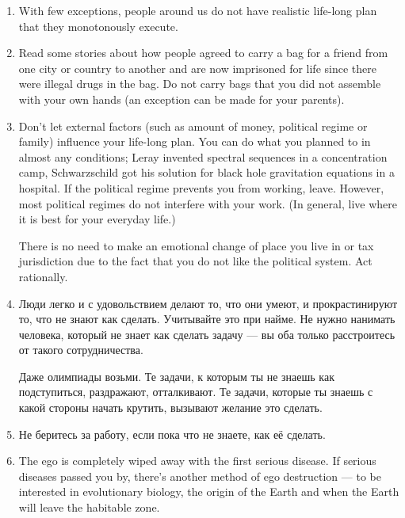 \documentclass[11pt]{article}
\theoremstyle{remark}
\theoremstyle{definition}
\begin{document}
\begin{enumerate}
\item With few exceptions, people around us do not have realistic life-long plan that they monotonously execute.

\item Read some stories about how people agreed to carry a bag for a friend from one city or country to another and are now imprisoned for life since there were illegal drugs in the bag. Do not carry bags that you did not assemble with your own hands (an exception can be made for your parents).


\item Don't let external factors (such as amount of money, political regime or family) influence your life-long plan. You can do what you planned to in almost any conditions; Leray invented spectral sequences in a concentration camp, Schwarzschild got his solution for black hole gravitation equations in a hospital. If the political regime prevents you from working, leave. However, most political regimes do not interfere with your work. (In general, live where it is best for your everyday life.)

There is no need to make an emotional change of place you live in or tax jurisdiction due to the fact that you do not like the political system. Act rationally.


\item Люди легко и с удовольствием делают то, что они умеют, и прокрастинируют то, что не знают как сделать. Учитывайте это при найме. Не нужно нанимать человека, который не знает как сделать задачу --- вы оба только расстроитесь от такого сотрудничества.


Даже олимпиады возьми. Те задачи, к которым ты не знаешь как подступиться, раздражают, отталкивают. Те задачи, которые ты знаешь с какой стороны начать крутить, вызывают желание это сделать.



\item Не беритесь за работу, если пока что не знаете, как её сделать.



\item The ego is completely wiped away with the first serious disease. If serious diseases passed you by, there's another method of ego destruction --- to be interested in evolutionary biology, the origin of the Earth and when the Earth will leave the habitable zone.


\end{enumerate}
\end{document}
